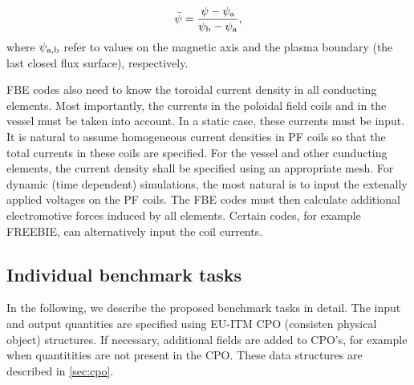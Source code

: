 \begin{equation}
\bar \psi  = \frac{{\psi  - {\psi _{\rm{a}}}}}{{{\psi _{\rm{b}}} - {\psi _{\rm{a}}}}},
\end{equation}
where $\psi _{\rm{a,b}}$ refer to values on the magnetic axis and the plasma boundary (the last closed flux surface), respectively.

FBE codes also need to know the toroidal current density in all conducting elements. Most importantly, the currents in the poloidal field coils and in the vessel must be taken into account. In a static case, these currents must be input. It is natural to assume homogeneous current densities in PF coils so that the total currents in these coils are specified. For the vessel and other cunducting elements, the current density shall be specified using an appropriate mesh. For dynamic (time dependent) simulations, the most natural is to input the extenally applied voltages on the PF coils. The FBE codes must then calculate additional electromotive forces induced by all elements. Certain codes, for example FREEBIE, can alternatively input the coil currents.


\subsection{Individual benchmark tasks} %
\label{ssub:individual_benchmark_tasks}

In the following, we describe the proposed benchmark tasks in detail. The input and output quantities are specified using EU-ITM CPO (consisten physical object) structures. If necessary, additional fields are added to CPO's, for example when quantitities are not present in the CPO. These data structures are described in \ref{sec:cpo}.

